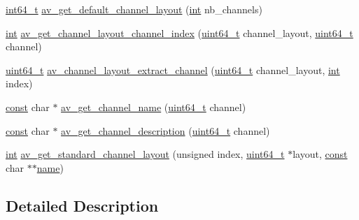 \begin{DoxyCompactItemize}
\item 
\hyperlink{lib-src_2ffmpeg_2win32_2stdint_8h_a67a9885ef4908cb72ce26d75b694386c}{int64\+\_\+t} \hyperlink{group__lavu__audio_gacb84f3e93a583e1f84a5283162a606a2}{av\+\_\+get\+\_\+default\+\_\+channel\+\_\+layout} (\hyperlink{xmltok_8h_a5a0d4a5641ce434f1d23533f2b2e6653}{int} nb\+\_\+channels)
\item 
\hyperlink{xmltok_8h_a5a0d4a5641ce434f1d23533f2b2e6653}{int} \hyperlink{group__lavu__audio_ga0669978493902b5ae723e386013da3ce}{av\+\_\+get\+\_\+channel\+\_\+layout\+\_\+channel\+\_\+index} (\hyperlink{lib-src_2ffmpeg_2win32_2stdint_8h_aec6fcb673ff035718c238c8c9d544c47}{uint64\+\_\+t} channel\+\_\+layout, \hyperlink{lib-src_2ffmpeg_2win32_2stdint_8h_aec6fcb673ff035718c238c8c9d544c47}{uint64\+\_\+t} channel)
\item 
\hyperlink{lib-src_2ffmpeg_2win32_2stdint_8h_aec6fcb673ff035718c238c8c9d544c47}{uint64\+\_\+t} \hyperlink{group__lavu__audio_gaf492843360fb4ecee6b5ec4166b04fcd}{av\+\_\+channel\+\_\+layout\+\_\+extract\+\_\+channel} (\hyperlink{lib-src_2ffmpeg_2win32_2stdint_8h_aec6fcb673ff035718c238c8c9d544c47}{uint64\+\_\+t} channel\+\_\+layout, \hyperlink{xmltok_8h_a5a0d4a5641ce434f1d23533f2b2e6653}{int} index)
\item 
\hyperlink{getopt1_8c_a2c212835823e3c54a8ab6d95c652660e}{const} char $\ast$ \hyperlink{group__lavu__audio_gaf9a5e23a9bbf5909f2dc84b25d78e35e}{av\+\_\+get\+\_\+channel\+\_\+name} (\hyperlink{lib-src_2ffmpeg_2win32_2stdint_8h_aec6fcb673ff035718c238c8c9d544c47}{uint64\+\_\+t} channel)
\item 
\hyperlink{getopt1_8c_a2c212835823e3c54a8ab6d95c652660e}{const} char $\ast$ \hyperlink{group__lavu__audio_gade4b74b99e3fb954b88b0cb8eddb785a}{av\+\_\+get\+\_\+channel\+\_\+description} (\hyperlink{lib-src_2ffmpeg_2win32_2stdint_8h_aec6fcb673ff035718c238c8c9d544c47}{uint64\+\_\+t} channel)
\item 
\hyperlink{xmltok_8h_a5a0d4a5641ce434f1d23533f2b2e6653}{int} \hyperlink{group__lavu__audio_ga00447bfae43d690f1f549a9e2521bf85}{av\+\_\+get\+\_\+standard\+\_\+channel\+\_\+layout} (unsigned index, \hyperlink{lib-src_2ffmpeg_2win32_2stdint_8h_aec6fcb673ff035718c238c8c9d544c47}{uint64\+\_\+t} $\ast$layout, \hyperlink{getopt1_8c_a2c212835823e3c54a8ab6d95c652660e}{const} char $\ast$$\ast$\hyperlink{lib_2expat_8h_a1b49b495b59f9e73205b69ad1a2965b0}{name})
\end{DoxyCompactItemize}


\subsection{Detailed Description}


